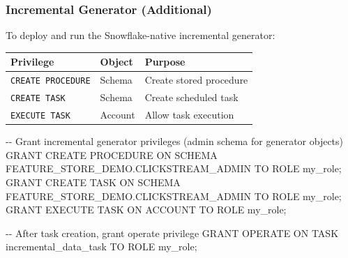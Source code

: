 \documentclass[
  letterpaper,
  DIV=11,
  numbers=noendperiod]{scrreprt}
\newenvironment{Shaded}{\begin{snugshade}}{\end{snugshade}}
\newcommand{\CommentTok}[1]{\textcolor[rgb]{0.37,0.37,0.37}{#1}}
\newcommand{\KeywordTok}[1]{\textcolor[rgb]{0.00,0.23,0.31}{#1}}
\newcommand{\NormalTok}[1]{\textcolor[rgb]{0.00,0.23,0.31}{#1}}
\begin{document}
\hypertarget{incremental-generator-additional}{%
\subsubsection{Incremental Generator
(Additional)}\label{incremental-generator-additional}}

To deploy and run the Snowflake-native incremental generator:

\begin{longtable}[]{@{}lll@{}}
\toprule\noalign{}
Privilege & Object & Purpose \\
\midrule\noalign{}
\endhead
\bottomrule\noalign{}
\endlastfoot
\texttt{CREATE\ PROCEDURE} & Schema & Create stored procedure \\
\texttt{CREATE\ TASK} & Schema & Create scheduled task \\
\texttt{EXECUTE\ TASK} & Account & Allow task execution \\
\end{longtable}

\begin{Shaded}
\begin{Highlighting}[]
\CommentTok{{-}{-} Grant incremental generator privileges (admin schema for generator objects)}
\KeywordTok{GRANT} \KeywordTok{CREATE} \KeywordTok{PROCEDURE} \KeywordTok{ON} \KeywordTok{SCHEMA}\NormalTok{ FEATURE\_STORE\_DEMO.CLICKSTREAM\_ADMIN }\KeywordTok{TO} \KeywordTok{ROLE}\NormalTok{ my\_role;}
\KeywordTok{GRANT} \KeywordTok{CREATE}\NormalTok{ TASK }\KeywordTok{ON} \KeywordTok{SCHEMA}\NormalTok{ FEATURE\_STORE\_DEMO.CLICKSTREAM\_ADMIN }\KeywordTok{TO} \KeywordTok{ROLE}\NormalTok{ my\_role;}
\KeywordTok{GRANT} \KeywordTok{EXECUTE}\NormalTok{ TASK }\KeywordTok{ON} \KeywordTok{ACCOUNT} \KeywordTok{TO} \KeywordTok{ROLE}\NormalTok{ my\_role;}

\CommentTok{{-}{-} After task creation, grant operate privilege}
\KeywordTok{GRANT}\NormalTok{ OPERATE }\KeywordTok{ON}\NormalTok{ TASK incremental\_data\_task }\KeywordTok{TO} \KeywordTok{ROLE}\NormalTok{ my\_role;}
\end{Highlighting}
\end{Shaded}
\end{document}
